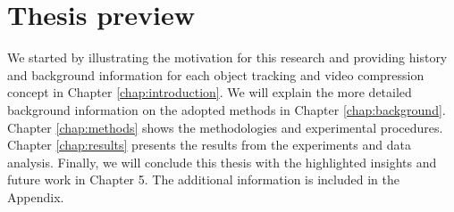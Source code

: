 \section{Thesis preview}
\label{sec:introduction/thesis_preview}

We started by illustrating the motivation for this research and providing history and background information for each object tracking and video compression concept in Chapter \ref{chap:introduction}. We will explain the more detailed background information on the adopted methods in Chapter \ref{chap:background}. Chapter \ref{chap:methods} shows the methodologies and experimental procedures. Chapter \ref{chap:results} presents the results from the experiments and data analysis. Finally, we will conclude this thesis with the highlighted insights and future work in Chapter 5. The additional information is included in the Appendix.
